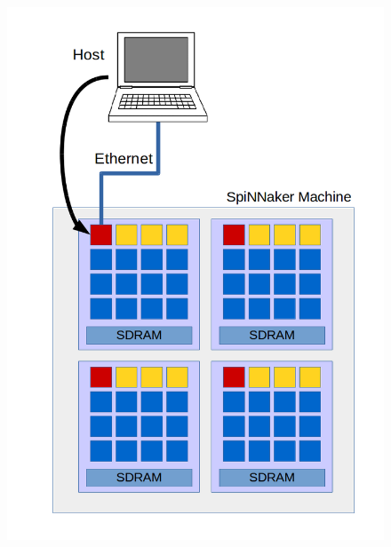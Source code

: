 \begin{figure}
\centering
\begin{minipage}{.32\textwidth}
  \centering
  \includegraphics[width=1\linewidth, natwidth=794, natheight=1123]{images/put1.png}
  \label{fig:host-root}
\end{minipage}%
\begin{minipage}{.32\textwidth}
  \centering

\end{minipage}
\end{figure}
